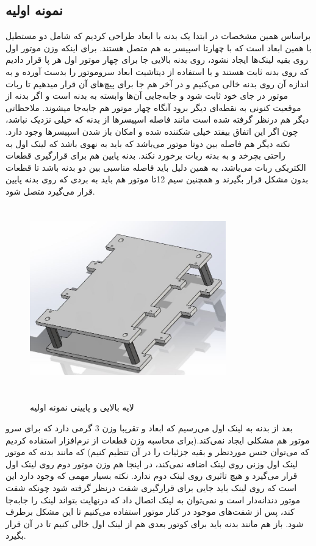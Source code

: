 \subsection{نمونه اولیه}
براساس همین مشخصات در ابتدا یک بدنه با ابعاد  طراحی کردیم که شامل دو مستطیل با همین ابعاد است که با چهارتا اسپیسر به هم متصل هستند. برای اینکه وزن موتور اول روی بقیه لینک‌ها ایجاد نشود، روی بدنه بالایی جا برای چهار موتور اول هر پا قرار دادیم که روی بدنه ثابت هستند و با استفاده از دیتاشیت 
\unskip{}
ابعاد سروموتور را بدست آورده و به اندازه آن روی بدنه خالی می‌کنیم و در آخر هم جا برای پیچ‌های آن قرار میدهیم تا ربات موتور در جای خود ثابت شود و جابه‌جایی آن‌ها وابسته به بدنه است و اگر بدنه از موقعیت کنونی به نقطه‌ای دیگر برود آنگاه چهار موتور هم جابه‌جا میشوند. ملاحظاتی دیگر هم درنظر گرفته شده است مانند فاصله اسپیسرها از بدنه که خیلی نزدیک نباشد، چون اگر این اتفاق بیفتد خیلی شکننده شده و امکان باز شدن اسپیسرها وجود دارد. نکته دیگر هم فاصله بین دوتا موتور می‌باشد که باید به نهوی باشد که لینک اول به راحتی بچرخد و به بدنه ربات برخورد نکند. بدنه پایین هم برای قرارگیری قطعات الکتریکی ربات می‌باشد، به همین دلیل باید فاصله مناسبی بین دو بدنه باشد تا قطعات بدون مشکل قرار بگیرند و همچنین سیم 12تا موتور هم باید به بردی که روی بدنه پایین قرار می‌گیرد متصل شود.

	\begin{figure}[!h]	
	\vspace{0.2cm}
	\centering
	\includegraphics[height=8cm,width=8.5cm]{./Images/CH2/Upper_Bottom_Layer_First.JPG}
	‌\caption{لایه بالایی و پایینی نمونه اولیه}
	\label{بدنه ربات نمونه اولیه}
	\end{figure}

\newpage	
بعد از بدنه به لینک اول می‌رسیم که ابعاد  و تقریبا وزن 3 گرمی دارد که برای سرو موتور هم مشکلی ایجاد نمی‌کند.(برای محاسبه وزن قطعات از نرم‌افزار  استفاده کردیم که می‌توان جنس موردنظر و بقیه جزئیات را در آن تنظیم کنیم) که مانند بدنه که موتور لینک اول وزنی روی لینک اضافه نمی‌کند، در اینجا هم وزن موتور دوم روی لینک اول قرار می‌گیرد و هیچ تاثیری روی لینک دوم ندارد. نکته بسیار مهمی که وجود دارد این است که روی لینک باید جایی برای قرارگیری شفت درنظر گرفته شود چونکه شفت موتور دندانه‌دار است و نمی‌توان به لینک اتصال داد که درنهایت بتواند لینک را جابه‌جا کند، پس از شفت‌های موجود در کنار موتور استفاده می‌کنیم تا این مشکل برطرف شود. باز هم مانند بدنه باید برای کوتور بعدی هم از لینک اول خالی کنیم تا در آن قرار بگیرد.

